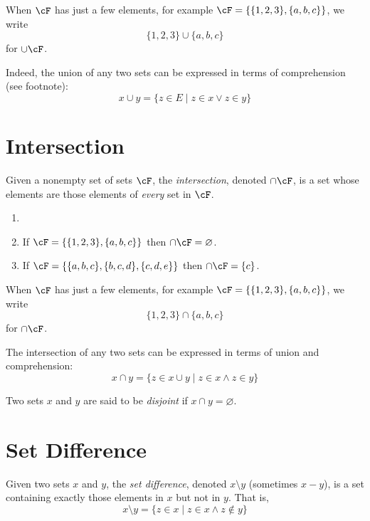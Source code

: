 \documentclass{amsart}
\begin{document}
\begin{notn}
  When $\cF$ has just a few elements, for example $\cF = \{\{1,2,3\},\{a,b,c\}\}$, we write
  \[
    \{1,2,3\} \cup \{a,b,c\}
  \]
  for $\cup\cF$.
\end{notn}

Indeed, the union of any two sets can be expressed in terms of comprehension (see footnote):
\[
  x \cup y = \{ z \in E \mid z \in x \vee z \in y \}
\]

\section{Intersection}
\label{sec:intersection}

\begin{defn}
  Given a nonempty set of sets $\cF$, the \emph{intersection}, denoted $\cap\cF$, is a set whose elements are those elements of \emph{every} set in $\cF$.
\end{defn}

\begin{eg}
  \begin{enumerate}
  \item[]
  \item If $\cF = \{\{1,2,3\},\{a,b,c\}\}$ then $\cap\cF = \varnothing$.
  \item If $\cF = \{\{a,b,c\},\{b,c,d\},\{c,d,e\}\}$ then $\cap\cF = \{c\}$.
  \end{enumerate}
\end{eg}

\begin{notn}
  When $\cF$ has just a few elements, for example $\cF = \{\{1,2,3\},\{a,b,c\}\}$, we write
  \[
    \{1,2,3\} \cap \{a,b,c\}
  \]
  for $\cap\cF$.
\end{notn}

The intersection of any two sets can be expressed in terms of union and comprehension:
\[
  x \cap y = \{z \in x \cup y \mid z \in x \wedge z \in y\}
\]

\begin{defn}
  Two sets $x$ and $y$ are said to be \emph{disjoint} if $x \cap y = \varnothing$.
\end{defn}

\section{Set Difference}
\label{sec:set-difference}

\begin{defn}
  Given two sets $x$ and $y$, the \emph{set difference}, denoted $x \setminus y$ (sometimes $x - y$), is a set containing exactly those elements in $x$ but not in $y$.
  That is,
  \[
    x \setminus y = \{z \in x \mid z \in x \wedge z \notin y\}
  \]
\end{defn}
\end{document}
